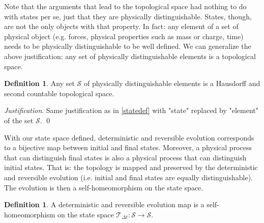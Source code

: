 \documentclass[aps,pra,10pt,twocolumn,floatfix,nofootinbib]{revtex4-1}
\theoremstyle{definition}
\newtheorem{defn}[prop]{Definition}
\newenvironment{justification}{\emph{Justification}.}{\qed}
\begin{document}
Note that the arguments that lead to the topological space had nothing to do with states per se, just that they are physically distinguishable. States, though, are not the only objects with that property. In fact: any element of a set of physical object (e.g. forces, physical properties such as mass or charge, time) needs to be physically distinguishable to be well defined. We can generalize the above justification: any set of physically distinguishable elements is a topological space.

\begin{defn}\label{topologically_distinguishable}
	Any set $\mathcal{S}$ of physically distinguishable elements is a Hausdorff and second countable topological space.
\end{defn}

\begin{justification}
	Same justification as in \ref{statedef} with "state" replaced by "element" of the set $\mathcal{S}$.
\end{justification}

With our state space defined, deterministic and reversible evolution corresponds to a bijective map between initial and final states. Moreover, a physical process that can distinguish final states is also a physical process that can distinguish initial states. That is: the topology is mapped and preserved by the deterministic and reversible evolution (i.e. initial and final states are equally distinguishable). The evolution is then a self-homeomorphism on the state space.

\begin{defn}\label{detrevmap}
A deterministic and reversible evolution map is a self-homeomorphism on the state space $\mathcal{T}_{\Delta t}:\mathcal{S} \rightarrow \mathcal{S}$.
\end{defn}
\end{document}
